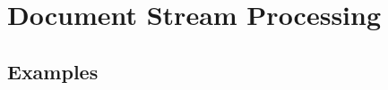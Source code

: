 \section{Document Stream Processing}
\label{Grelgdnuan_vno_Bleototuh_Lwo_Egerny_BLE}

\subsection{Examples}
\label{Riado_Lyaer_RL}
